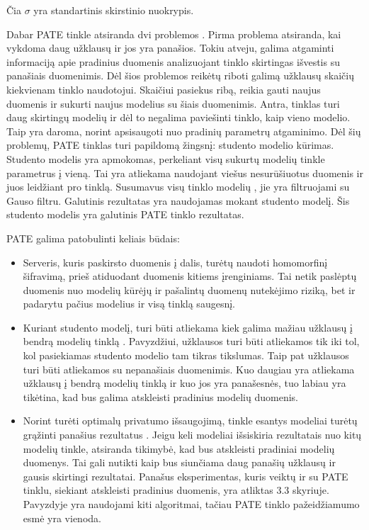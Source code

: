 \documentclass{VUMIFInfBakalaurinis}
\begin{document}
Čia $\sigma$ yra standartinis skirstinio nuokrypis. 
\par Dabar PATE tinkle atsiranda dvi problemos \cite{27}. Pirma problema atsiranda, kai vykdoma daug užklausų ir jos yra panašios. Tokiu atveju, galima atgaminti informaciją apie pradinius duomenis analizuojant tinklo skirtingas išvestis su panašiais duomenimis. Dėl šios problemos reikėtų riboti galimą užklausų skaičių kiekvienam tinklo naudotojui. Skaičiui pasiekus ribą, reikia gauti naujus duomenis ir sukurti naujus modelius su šiais duomenimis. Antra, tinklas turi daug skirtingų modelių ir dėl to negalima paviešinti tinklo, kaip vieno modelio. Taip yra daroma, norint apsisaugoti nuo pradinių parametrų atgaminimo. Dėl šių problemų, PATE tinklas turi papildomą žingsnį: studento modelio kūrimas. Studento modelis yra apmokomas, perkeliant visų sukurtų modelių tinkle parametrus į vieną. Tai yra atliekama naudojant viešus nesurūšiuotus duomenis ir juos leidžiant pro tinklą. Susumavus visų tinklo modelių , jie yra filtruojami su Gauso filtru. Galutinis rezultatas yra naudojamas mokant studento modelį. Šis studento modelis yra galutinis PATE tinklo rezultatas.
\par PATE galima patobulinti keliais būdais:
\begin{itemize}
    \item Serveris, kuris paskirsto duomenis į dalis, turėtų naudoti homomorfinį šifravimą, prieš atiduodant duomenis kitiems įrenginiams. Tai netik paslėptų duomenis nuo modelių kūrėjų ir pašalintų duomenų nutekėjimo riziką, bet ir padarytu pačius modelius ir visą tinklą saugesnį.
    \item Kuriant studento modelį, turi būti atliekama kiek galima mažiau užklausų į bendrą modelių tinklą \cite{26}. Pavyzdžiui, užklausos turi būti atliekamos tik iki tol, kol pasiekiamas studento modelio tam tikras tikslumas. Taip pat užklausos turi būti atliekamos su nepanašiais duomenimis. Kuo daugiau yra atliekama užklausų į bendrą modelių tinklą ir kuo jos yra panašesnės, tuo labiau yra tikėtina, kad bus galima atskleisti pradinius modelių duomenis.
    \item Norint turėti optimalų privatumo išsaugojimą, tinkle esantys modeliai turėtų grąžinti panašius rezultatus \cite{26}. Jeigu keli modeliai išsiskiria rezultatais nuo kitų modelių tinkle, atsiranda tikimybė, kad bus atskleisti pradiniai modelių duomenys. Tai gali nutikti kaip bus siunčiama daug panašių užklausų ir gausis skirtingi rezultatai. Panašus eksperimentas, kuris veiktų ir su PATE tinklu, siekiant atskleisti pradinius duomenis, yra atliktas 3.3 skyriuje. Pavyzdyje yra naudojami kiti algoritmai, tačiau PATE tinklo pažeidžiamumo esmė yra vienoda.
\end{itemize}
\end{document}
